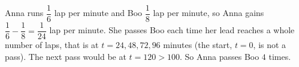 Anna runs $\dfrac{1}{6}$ lap per minute and Boo $\dfrac{1}{8}$ lap per minute, so Anna gains $\dfrac{1}{6}-\dfrac{1}{8}=\dfrac{1}{24}$ lap per minute. She passes Boo each time her lead reaches a whole number of laps, that is at $t=24,48,72,96$ minutes (the start, $t=0$, is not a pass). The next pass would be at $t=120>100$. So Anna passes Boo $\boxed{4}$ times.
